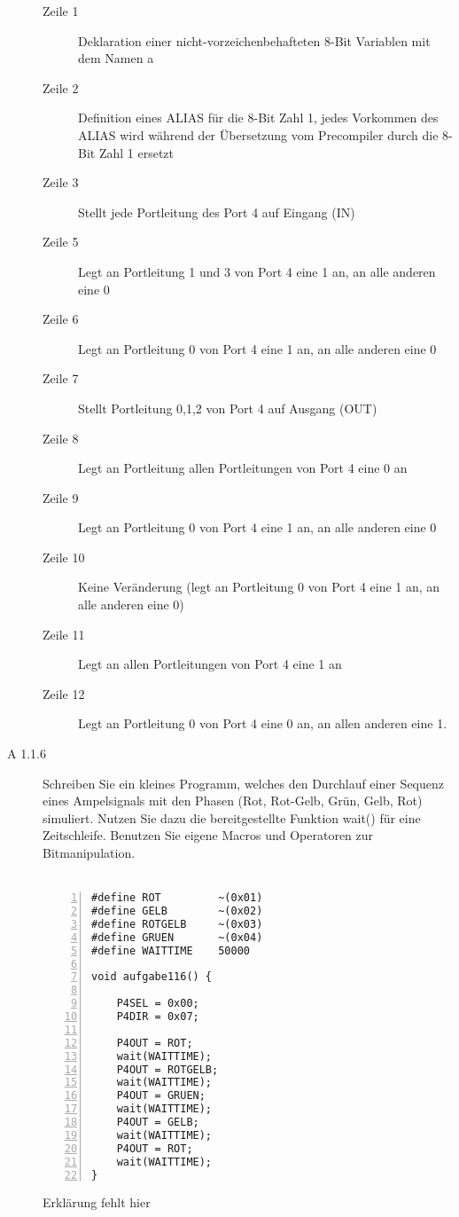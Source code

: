 \documentclass[11pt,a4paper,ngerman]{article}
\begin{document}
\begin{description}
		\begin{description}
		\item[Zeile 1] Deklaration einer nicht-vorzeichenbehafteten 8-Bit Variablen mit dem Namen a 
		\item[Zeile 2] Definition eines ALIAS für die 8-Bit Zahl 1, jedes Vorkommen des ALIAS wird  während der Übersetzung vom Precompiler durch die 8-Bit Zahl 1 ersetzt
		\item[Zeile 3] Stellt jede Portleitung des Port 4 auf Eingang (IN)
		\item[Zeile 5] Legt an Portleitung 1 und 3 von Port 4 eine 1 an, an alle anderen eine 0
		\item[Zeile 6] Legt an Portleitung 0 von Port 4 eine 1 an, an alle anderen eine 0
		\item[Zeile 7] Stellt Portleitung 0,1,2 von Port 4 auf Ausgang (OUT)
		\item[Zeile 8] Legt an Portleitung allen Portleitungen von Port 4 eine 0 an
		\item[Zeile 9] Legt an Portleitung 0 von Port 4 eine 1 an, an alle anderen eine 0
		\item[Zeile 10] Keine Veränderung (legt an Portleitung 0 von Port 4 eine 1 an, an alle anderen eine 0)
		\item[Zeile 11] Legt an allen Portleitungen von Port 4 eine 1 an
		\item[Zeile 12] Legt an Portleitung 0 von Port 4 eine 0 an, an allen anderen eine 1.
		\end{description}
		
		
	\item[A 1.1.6] Schreiben Sie ein kleines Programm, welches den Durchlauf einer Sequenz eines Ampelsignals mit den Phasen (Rot, Rot-Gelb, Grün, Gelb, Rot) simuliert. Nutzen Sie dazu die bereitgestellte Funktion wait() für eine Zeitschleife. Benutzen Sie eigene Macros und Operatoren zur Bitmanipulation.  \\ \\
	
		\begin{lstlisting}[numbers=left]
#define ROT 		~(0x01)
#define GELB  		~(0x02)
#define ROTGELB 	~(0x03)
#define GRUEN 		~(0x04)
#define WAITTIME	50000

void aufgabe116() {

	P4SEL = 0x00;
	P4DIR = 0x07;

	P4OUT = ROT;
	wait(WAITTIME);
	P4OUT = ROTGELB;
	wait(WAITTIME);
	P4OUT = GRUEN;
	wait(WAITTIME);
	P4OUT = GELB;
	wait(WAITTIME);
	P4OUT = ROT;
	wait(WAITTIME);
}
		\end{lstlisting}
		Erklärung fehlt hier
\end{description}
\end{document}
